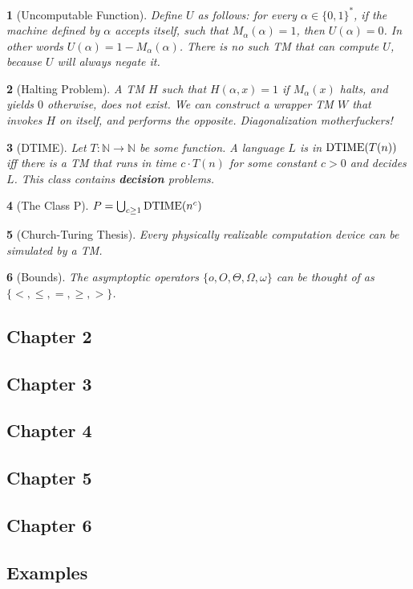 \documentclass[10pt]{article}
\newtheorem{note}{}[section]
\begin{document}
\begin{note}[Uncomputable Function]
  Define $U$ as follows: for every $\alpha \in \{0, 1\}^\ast$, if the machine
  defined by $\alpha$ accepts itself, such that $M_\alpha (\alpha) = 1$, then
  $U(\alpha) = 0$.
  In other words $U(\alpha) = 1 - M_\alpha (\alpha)$.
  There is no such TM that can compute $U$, because $U$ will always negate it.
\end{note}

\begin{note}[Halting Problem]
  A TM $H$ such that $H(\alpha, x) = 1$ if $M_\alpha (x)$ halts, and yields
  $0$ otherwise, does not exist.
  We can construct a wrapper TM $W$ that invokes $H$ on itself, and performs
  the opposite.
  Diagonalization motherfuckers!
\end{note}

\begin{note}[DTIME]
  Let $T : \mathbb{N} \to \mathbb{N}$ be some function.
  A language $L$ is in $\mathrm{DTIME}(T(n))$ iff there is a TM that runs in time
  $c \cdot T(n)$ for some constant $c > 0$ and decides $L$.
  This class contains \textbf{decision} problems.
\end{note}

\begin{note}[The Class P]
  $P = \bigcup_{c \geq 1} \mathrm{DTIME}(n^c)$
\end{note}

\begin{note}[Church-Turing Thesis]
  Every physically realizable computation device can be simulated by a TM.
\end{note}

\begin{note}[Bounds]
  The asymptoptic operators $\{o, O, \Theta, \Omega, \omega\}$ can be thought
  of as $\{ <, \leq, =, \geq, > \}$.
\end{note}

\subsection*{Chapter 2}
  


\subsection*{Chapter 3}



\subsection*{Chapter 4}


\subsection*{Chapter 5}



\subsection*{Chapter 6}


\subsection*{Examples}
\end{document}
